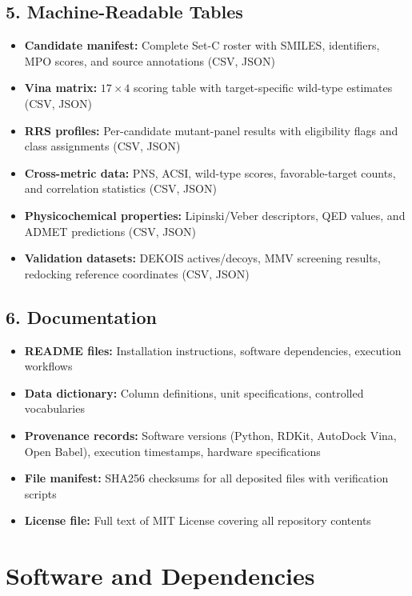 \documentclass[11pt,a4paper]{article}
\begin{document}
\subsection*{5. Machine-Readable Tables}

\begin{itemize}[leftmargin=*]
\item \textbf{Candidate manifest:} Complete Set-C roster with SMILES, identifiers, MPO scores, and source annotations (CSV, JSON)
\item \textbf{Vina matrix:} $17 \times 4$ scoring table with target-specific wild-type estimates (CSV, JSON)
\item \textbf{RRS profiles:} Per-candidate mutant-panel results with eligibility flags and class assignments (CSV, JSON)
\item \textbf{Cross-metric data:} PNS, ACSI, wild-type scores, favorable-target counts, and correlation statistics (CSV, JSON)
\item \textbf{Physicochemical properties:} Lipinski/Veber descriptors, QED values, and ADMET predictions (CSV, JSON)
\item \textbf{Validation datasets:} DEKOIS actives/decoys, MMV screening results, redocking reference coordinates (CSV, JSON)
\end{itemize}

\subsection*{6. Documentation}

\begin{itemize}[leftmargin=*]
\item \textbf{README files:} Installation instructions, software dependencies, execution workflows
\item \textbf{Data dictionary:} Column definitions, unit specifications, controlled vocabularies
\item \textbf{Provenance records:} Software versions (Python, RDKit, AutoDock Vina, Open Babel), execution timestamps, hardware specifications
\item \textbf{File manifest:} SHA256 checksums for all deposited files with verification scripts
\item \textbf{License file:} Full text of MIT License covering all repository contents
\end{itemize}

\section*{Software and Dependencies}
\end{document}
